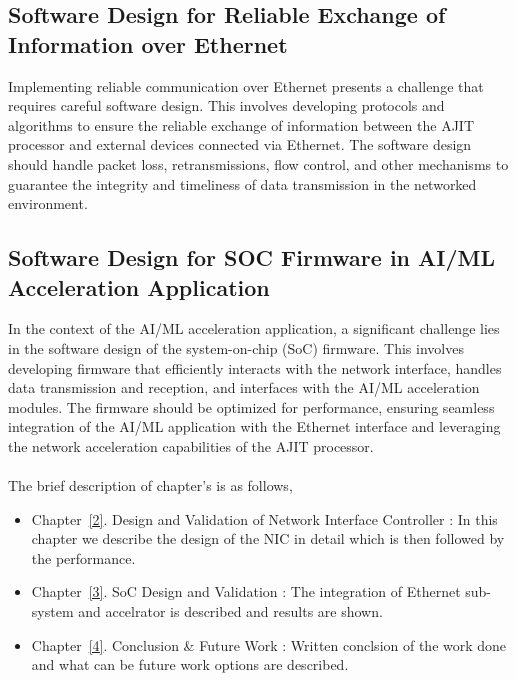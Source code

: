 \documentclass[12pt]{report}
\begin{document}
		\subsection{Software Design for Reliable Exchange of Information over Ethernet}
   Implementing reliable communication over Ethernet presents a challenge that requires careful software design. This involves developing protocols and algorithms to ensure the reliable exchange of information between the AJIT processor and external devices connected via Ethernet. The software design should handle packet loss, retransmissions, flow control, and other mechanisms to guarantee the integrity and timeliness of data transmission in the networked environment.

		\subsection{Software Design for SOC Firmware in AI/ML Acceleration Application}
   In the context of the AI/ML acceleration application, a significant challenge lies in the software design of the system-on-chip (SoC) firmware. This involves developing firmware that efficiently interacts with the network interface, handles data transmission and reception, and interfaces with the AI/ML acceleration modules. The firmware should be optimized for performance, ensuring seamless integration of the AI/ML application with the Ethernet interface and leveraging the network acceleration capabilities of the AJIT processor.\\\\





	The brief description of chapter's is as follows,

	\begin{itemize}
		\item Chapter~\ref{2}. Design and Validation of Network Interface Controller : In this chapter we describe the design of the NIC in detail which is then followed by the performance.
		\item Chapter~\ref{3}. SoC Design and Validation : The integration of Ethernet sub-system and accelrator is described and results are shown.
		\item Chapter~\ref{4}. Conclusion \& Future Work : Written conclsion of the work done and what can be future work options are described.
	\end{itemize}

\end{document}
